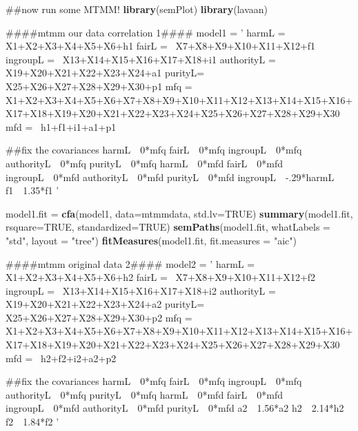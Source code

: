 \documentclass[english,man]{apa6}
\newenvironment{Shaded}{\begin{snugshade}}{\end{snugshade}}
\newcommand{\KeywordTok}[1]{\textcolor[rgb]{0.13,0.29,0.53}{\textbf{#1}}}
\newcommand{\DataTypeTok}[1]{\textcolor[rgb]{0.13,0.29,0.53}{#1}}
\newcommand{\StringTok}[1]{\textcolor[rgb]{0.31,0.60,0.02}{#1}}
\newcommand{\OtherTok}[1]{\textcolor[rgb]{0.56,0.35,0.01}{#1}}
\newcommand{\NormalTok}[1]{#1}
\theoremstyle{definition}
\theoremstyle{definition}
\theoremstyle{definition}
\theoremstyle{remark}
\begin{document}
\begin{Shaded}
\begin{Highlighting}[]
\NormalTok{##now run some MTMM!}
\KeywordTok{library}\NormalTok{(semPlot)}
\KeywordTok{library}\NormalTok{(lavaan)}

\NormalTok{####mtmm our data correlation 1####}
\NormalTok{model1 =}\StringTok{ '}
\StringTok{harmL =~ X1+X2+X3+X4+X5+X6+h1}
\StringTok{fairL =~ X7+X8+X9+X10+X11+X12+f1}
\StringTok{ingroupL =~ X13+X14+X15+X16+X17+X18+i1}
\StringTok{authorityL =~ X19+X20+X21+X22+X23+X24+a1}
\StringTok{purityL=~ X25+X26+X27+X28+X29+X30+p1}
\StringTok{mfq =~ X1+X2+X3+X4+X5+X6+X7+X8+X9+X10+X11+X12+X13+X14+X15+X16+X17+X18+X19+X20+X21+X22+X23+X24+X25+X26+X27+X28+X29+X30}
\StringTok{mfd =~ h1+f1+i1+a1+p1}

\StringTok{##fix the covariances}
\StringTok{harmL~~0*mfq}
\StringTok{fairL~~0*mfq}
\StringTok{ingroupL~~0*mfq}
\StringTok{authorityL~~0*mfq}
\StringTok{purityL~~0*mfq}
\StringTok{harmL~~0*mfd}
\StringTok{fairL~~0*mfd}
\StringTok{ingroupL~~0*mfd}
\StringTok{authorityL~~0*mfd}
\StringTok{purityL~~0*mfd}
\StringTok{ingroupL~~-.29*harmL}
\StringTok{f1~~1.35*f1}
\StringTok{'}

\NormalTok{model1.fit =}\StringTok{ }\KeywordTok{cfa}\NormalTok{(model1, }\DataTypeTok{data=}\NormalTok{mtmmdata, }\DataTypeTok{std.lv=}\OtherTok{TRUE}\NormalTok{)}
\KeywordTok{summary}\NormalTok{(model1.fit, }\DataTypeTok{rsquare=}\OtherTok{TRUE}\NormalTok{, }\DataTypeTok{standardized=}\OtherTok{TRUE}\NormalTok{)}
\KeywordTok{semPaths}\NormalTok{(model1.fit, }\DataTypeTok{whatLabels =} \StringTok{"std"}\NormalTok{, }\DataTypeTok{layout =} \StringTok{"tree"}\NormalTok{)}
\KeywordTok{fitMeasures}\NormalTok{(model1.fit, }\DataTypeTok{fit.measures =} \StringTok{"aic"}\NormalTok{)}


\NormalTok{####mtmm original data 2####}
\NormalTok{model2 =}\StringTok{ '}
\StringTok{harmL =~ X1+X2+X3+X4+X5+X6+h2}
\StringTok{fairL =~ X7+X8+X9+X10+X11+X12+f2}
\StringTok{ingroupL =~ X13+X14+X15+X16+X17+X18+i2}
\StringTok{authorityL =~ X19+X20+X21+X22+X23+X24+a2}
\StringTok{purityL=~ X25+X26+X27+X28+X29+X30+p2}
\StringTok{mfq =~ X1+X2+X3+X4+X5+X6+X7+X8+X9+X10+X11+X12+X13+X14+X15+X16+X17+X18+X19+X20+X21+X22+X23+X24+X25+X26+X27+X28+X29+X30}
\StringTok{mfd =~ h2+f2+i2+a2+p2}

\StringTok{##fix the covariances}
\StringTok{harmL~~0*mfq}
\StringTok{fairL~~0*mfq}
\StringTok{ingroupL~~0*mfq}
\StringTok{authorityL~~0*mfq}
\StringTok{purityL~~0*mfq}
\StringTok{harmL~~0*mfd}
\StringTok{fairL~~0*mfd}
\StringTok{ingroupL~~0*mfd}
\StringTok{authorityL~~0*mfd}
\StringTok{purityL~~0*mfd}
\StringTok{a2~~1.56*a2}
\StringTok{h2~~2.14*h2}
\StringTok{f2~~1.84*f2}
\StringTok{'}


\end{Highlighting}
\end{Shaded}
\end{document}
